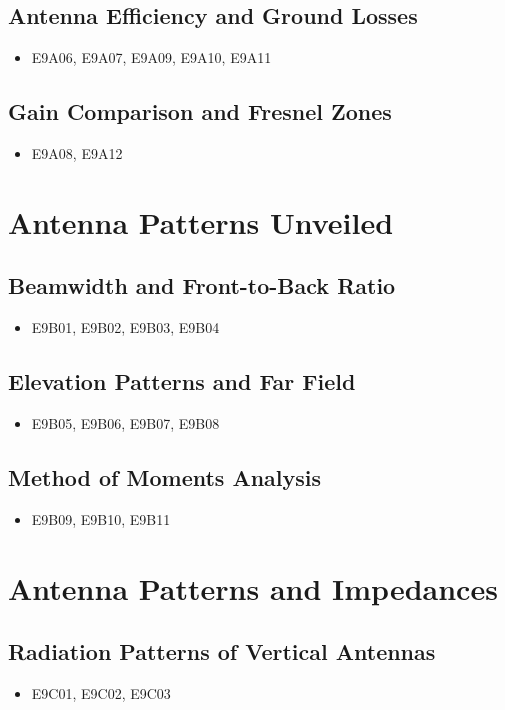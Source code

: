 \documentclass{book}
\begin{document}
\subsection{Antenna Efficiency and Ground Losses}
\begin{itemize}
    \item E9A06, E9A07, E9A09, E9A10, E9A11
\end{itemize}
\subsection{Gain Comparison and Fresnel Zones}
\begin{itemize}
    \item E9A08, E9A12
\end{itemize}

\section{Antenna Patterns Unveiled}
\subsection{Beamwidth and Front-to-Back Ratio}
\begin{itemize}
    \item E9B01, E9B02, E9B03, E9B04
\end{itemize}
\subsection{Elevation Patterns and Far Field}
\begin{itemize}
    \item E9B05, E9B06, E9B07, E9B08
\end{itemize}
\subsection{Method of Moments Analysis}
\begin{itemize}
    \item E9B09, E9B10, E9B11
\end{itemize}

\section{Antenna Patterns and Impedances}
\subsection{Radiation Patterns of Vertical Antennas}
\begin{itemize}
    \item E9C01, E9C02, E9C03
\end{itemize}
\end{document}
